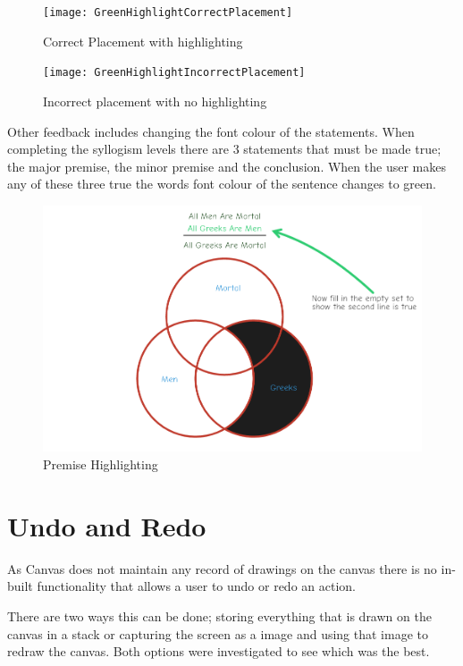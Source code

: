 \documentclass[12pt,a4paper]{report}
\begin{document}
\begin{figure}[!h]
  \centering
  \begin{minipage}[b]{0.4\textwidth}
    \texttt{[image: GreenHighlightCorrectPlacement]}
    \caption{Correct Placement with highlighting}
  \end{minipage}
  \hfill
  \begin{minipage}[b]{0.4\textwidth}
    \texttt{[image: GreenHighlightIncorrectPlacement]}
    \caption{Incorrect placement with no highlighting}
  \end{minipage}
\end{figure}
\FloatBarrier

Other feedback includes changing the font colour of the statements. When completing the syllogism levels there are 3 statements that must be made true; the major premise, the minor premise and the conclusion. When the user makes any of these three true the words font colour of the sentence changes to green.


\begin{figure}[h]
\centering
    \includegraphics[scale=0.4]{PremiseHighlight}
    \caption{Premise Highlighting}
    \label{fig:premiseHighlight}
\end{figure}
\FloatBarrier



\section{Undo and Redo}
As Canvas does not maintain any record of drawings on the canvas there is no in-built functionality that allows a user to undo or redo an action. 

There are two ways this can be done; storing everything that is drawn on the canvas in a stack or capturing the screen as a image and using that image to redraw the canvas. Both options were investigated to see which was the best.
\end{document}
